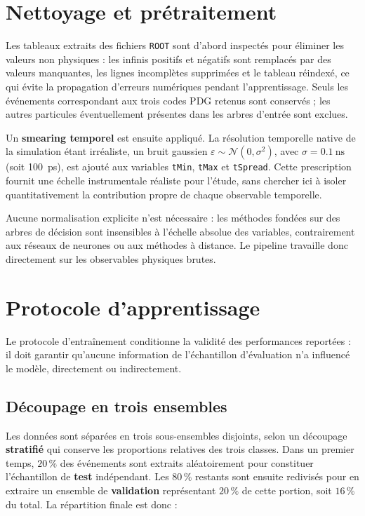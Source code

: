 \section{Nettoyage et prétraitement}
\label{app:pid_preprocessing}

Les tableaux extraits des fichiers \texttt{ROOT} sont d'abord inspectés pour éliminer les valeurs non physiques : les infinis positifs et négatifs sont remplacés par des valeurs manquantes, les lignes incomplètes supprimées et le tableau réindexé, ce qui évite la propagation d'erreurs numériques pendant l'apprentissage. Seuls les événements correspondant aux trois codes PDG retenus sont conservés ; les autres particules éventuellement présentes dans les arbres d'entrée sont exclues.

Un \textbf{smearing temporel} est ensuite appliqué. La résolution temporelle native de la simulation étant irréaliste, un bruit gaussien \(\varepsilon \sim \mathcal{N}(0,\sigma^2)\), avec \(\sigma = 0.1~\mathrm{ns}\) (soit \SI{100}{ps}), est ajouté aux variables \texttt{tMin}, \texttt{tMax} et \texttt{tSpread}. Cette prescription fournit une échelle instrumentale réaliste pour l'étude, sans chercher ici à isoler quantitativement la contribution propre de chaque observable temporelle.

Aucune normalisation explicite n'est nécessaire : les méthodes fondées sur des arbres de décision sont insensibles à l'échelle absolue des variables, contrairement aux réseaux de neurones ou aux méthodes à distance. Le pipeline travaille donc directement sur les observables physiques brutes.

\section{Protocole d'apprentissage}
\label{app:pid_split}

Le protocole d'entraînement conditionne la validité des performances reportées : il doit garantir qu'aucune information de l'échantillon d'évaluation n'a influencé le modèle, directement ou indirectement.

\subsection*{Découpage en trois ensembles}

Les données sont séparées en trois sous-ensembles disjoints, selon un découpage \textbf{stratifié} qui conserve les proportions relatives des trois classes. Dans un premier temps, \(20\,\%\) des événements sont extraits aléatoirement pour constituer l'échantillon de \textbf{test} indépendant. Les \(80\,\%\) restants sont ensuite redivisés pour en extraire un ensemble de \textbf{validation} représentant \(20\,\%\) de cette portion, soit \(16\,\%\) du total. La répartition finale est donc :

